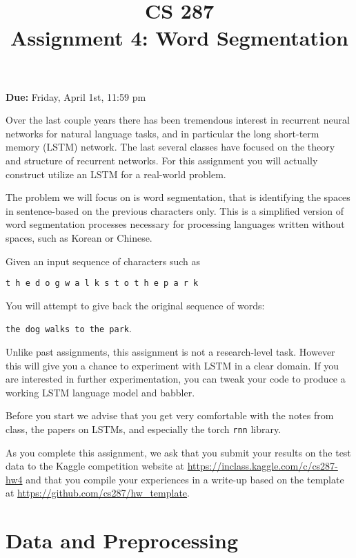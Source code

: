 \documentclass[11pt]{article}
\title{CS 287 \\ Assignment 4: Word Segmentation}
\date{}
\begin{document}
\maketitle{}

\begin{center}
  \textbf{Due:} Friday, April 1st, 11:59 pm 
\end{center}


Over the last couple years there has been tremendous interest in
recurrent neural networks for natural language tasks, and in
particular the long short-term memory (LSTM) network. The last 
several classes have focused on the theory and structure of 
recurrent networks. For this assignment you will actually 
construct utilize an LSTM for a real-world problem. 

The problem we will focus on is word segmentation, that is identifying
the spaces in sentence-based on the previous characters only.  This is
a simplified version of word segmentation processes necessary for
processing languages written without spaces, such as Korean or
Chinese.  

Given an input sequence of characters such as 
\begin{center}
  \texttt{t h e d o g w a l k s t o t h e p a r k}
\end{center}

\noindent You will attempt to give back the
original sequence of words:

\begin{center}
  \texttt{the dog walks to the park}.
\end{center}

Unlike
past assignments, this assignment is not a research-level
task. However this will give you a chance to experiment with LSTM in a
clear domain. If you are interested in further experimentation, you 
can tweak your code to produce a working LSTM language model and babbler. 

Before you start we advise that you get very comfortable with the
notes from class, the papers on LSTMs, and especially the torch
\texttt{rnn} library.

As you complete this assignment, we ask that you submit your results
on the test data to the Kaggle competition website at
\url{https://inclass.kaggle.com/c/cs287-hw4} and that you compile your
experiences in a write-up based on the template at
\url{https://github.com/cs287/hw_template}.

\section{Data and Preprocessing}
\end{document}
